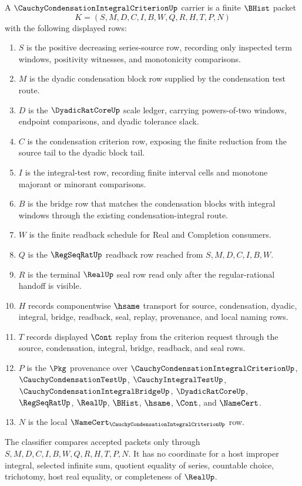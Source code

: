 \begin{definition}
\label{def:cauchy-condensation-integral-criterion-carrier}
A $\CauchyCondensationIntegralCriterionUp$ carrier is a finite $\BHist$ packet
$$
K=(S,M,D,C,I,B,W,Q,R,H,T,P,N)
$$
with the following displayed rows:
\begin{enumerate}
\item $S$ is the positive decreasing series-source row, recording only inspected term windows, positivity witnesses, and monotonicity comparisons.
\item $M$ is the dyadic condensation block row supplied by the condensation test route.
\item $D$ is the $\DyadicRatCoreUp$ scale ledger, carrying powers-of-two windows, endpoint comparisons, and dyadic tolerance slack.
\item $C$ is the condensation criterion row, exposing the finite reduction from the source tail to the dyadic block tail.
\item $I$ is the integral-test row, recording finite interval cells and monotone majorant or minorant comparisons.
\item $B$ is the bridge row that matches the condensation blocks with integral windows through the existing condensation-integral route.
\item $W$ is the finite readback schedule for Real and Completion consumers.
\item $Q$ is the $\RegSeqRatUp$ readback row reached from $S,M,D,C,I,B,W$.
\item $R$ is the terminal $\RealUp$ seal row read only after the regular-rational handoff is visible.
\item $H$ records componentwise $\hsame$ transport for source, condensation, dyadic, integral, bridge, readback, seal, replay, provenance, and local naming rows.
\item $T$ records displayed $\Cont$ replay from the criterion request through the source, condensation, integral, bridge, readback, and seal rows.
\item $P$ is the $\Pkg$ provenance over $\CauchyCondensationIntegralCriterionUp$, $\CauchyCondensationTestUp$, $\CauchyIntegralTestUp$, $\CauchyCondensationIntegralBridgeUp$, $\DyadicRatCoreUp$, $\RegSeqRatUp$, $\RealUp$, $\BHist$, $\hsame$, $\Cont$, and $\NameCert$.
\item $N$ is the local $\NameCert_{\CauchyCondensationIntegralCriterionUp}$ row.
\end{enumerate}
The classifier compares accepted packets only through $S,M,D,C,I,B,W,Q,R,H,T,P,N$. It has no coordinate for a host improper integral, selected infinite sum, quotient equality of series, countable choice, trichotomy, host real equality, or completeness of $\RealUp$.
\end{definition}

